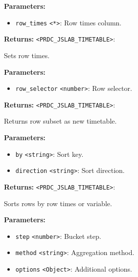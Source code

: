 \documentclass[12pt,a4paper]{article}
\begin{document}
\noindent \textbf{Parameters:}
\begin{itemize}
  \item \texttt{row\_times} \texttt{<*>}: Row times column.
\end{itemize}

\noindent \textbf{Returns:} \texttt{<PRDC\_JSLAB\_TIMETABLE>}:

\noindent Sets row times.

\vspace{5mm}
\noindent {}


\noindent \textbf{Parameters:}
\begin{itemize}
  \item \texttt{row\_selector} \texttt{<number>}: Row selector.
\end{itemize}

\noindent \textbf{Returns:} \texttt{<PRDC\_JSLAB\_TIMETABLE>}:

\noindent Returns row subset as new timetable.

\vspace{5mm}
\noindent {}


\noindent \textbf{Parameters:}
\begin{itemize}
  \item \texttt{by} \texttt{<string>}: Sort key.
  \item \texttt{direction} \texttt{<string>}: Sort direction.
\end{itemize}

\noindent \textbf{Returns:} \texttt{<PRDC\_JSLAB\_TIMETABLE>}:

\noindent Sorts rows by row times or variable.

\vspace{5mm}
\noindent {}


\noindent \textbf{Parameters:}
\begin{itemize}
  \item \texttt{step} \texttt{<number>}: Bucket step.
  \item \texttt{method} \texttt{<string>}: Aggregation method.
  \item \texttt{options} \texttt{<Object>}: Additional options.
\end{itemize}
\end{document}
